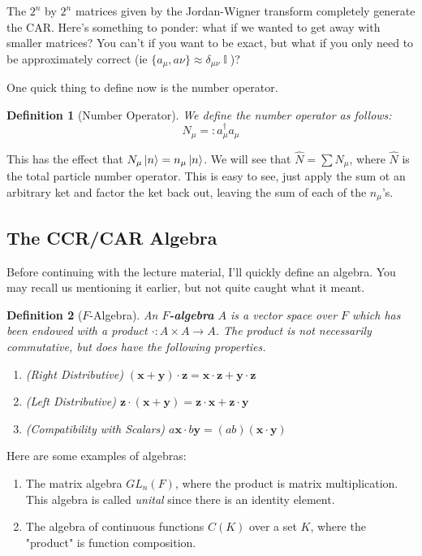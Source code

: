 \documentclass{article}
\DeclareMathOperator{\II}{\mathbb{I}}
\newcommand{\ve}[1]{\mathbf{#1}}
\newtheorem{defn}{Definition}
\begin{document}
The $2^n$ by $2^n$ matrices given by the Jordan-Wigner transform completely generate the CAR. Here's something to ponder: what if we wanted to get away with smaller matrices? You can't if you want to be exact, but what if you only need to be approximately correct (ie $\{a_\mu,a\nu\} \approx \delta_{\mu \nu}\II$)?

One quick thing to define now is the number operator.
\begin{defn}[Number Operator] We define the number operator as follows:
\begin{equation}N_\mu =: a_\mu^\dagger a_\mu\end{equation}
\end{defn}
This has the effect that $N_\mu\ket{n} = n_\mu\ket{n}$. We will see that $\hat N = \sum N_\mu$, where $\hat N$ is the total particle number operator. This is easy to see, just apply the sum ot an arbitrary ket and factor the ket back out, leaving the sum of each of the $n_\mu$'s.

\subsection{The CCR/CAR Algebra}
Before continuing with the lecture material, I'll quickly define an algebra. You may recall us mentioning it earlier, but not quite caught what it meant.
\begin{defn}[$F$-Algebra]
An \textbf{$F$-algebra} $A$ is a vector space over $F$ which has been endowed with a  product $\cdot : A\times A \to A$. The product is not necessarily commutative, but does have the following properties.
\begin{enumerate}
\item (Right Distributive) $(\ve{x}+\ve{y})\cdot \ve{z} = \ve{x}\cdot \ve{z} + \ve{y}\cdot \ve{z}$
\item (Left Distributive) $\ve{z}\cdot(\ve{x}+\ve{y}) = \ve{z}\cdot \ve{x} + \ve{z} \cdot \ve{y}$
\item (Compatibility with Scalars) $a\ve{x}\cdot b\ve{y} = (ab)(\ve{x}\cdot \ve{y})$
\end{enumerate}
\end{defn}

Here are some examples of algebras:
\begin{enumerate}
\item The matrix algebra $GL_n(F)$, where the product is matrix multiplication. This algebra is called \textit{unital} since there is an identity element.
\item The algebra of continuous functions $C(K)$ over a set $K$, where the "product" is function composition.
\end{enumerate}
\end{document}
